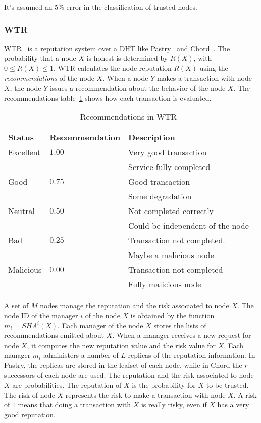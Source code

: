 It's assumed an $5\%$ error in the classification of trusted nodes.

\subsubsection{WTR}
\label{sec:wtr}
WTR~\cite{bonnaire2009wtr} is a reputation system over a DHT like Pastry~\cite{pastry} and
Chord~\cite{chord}. The probability that a node $X$ is honest is determined by
$R(X)$, with $0 \leq R(X) \leq 1$. WTR calculates the node reputation $R(X)$
using the \textit{recommendations} of the node $X$. When a node $Y$ makes a transaction with
node $X$, the node $Y$ issues a recommendation about the behavior of the node
$X$. The recommendations table~\ref{table:wtr_recomendations} shows how each
transaction is evaluated.
 
  \begin{table}
    \centering
    \footnotesize
    \begin{tabular}{|l|l|l|}
      \hline
      \textbf{Status} & \textbf{Recommendation} & \textbf{Description}\\
      \hline
      Excellent  & $1.00$    & Very good transaction\\
                &           & Service fully completed\\
      Good      & $0.75$    & Good transaction\\
                &           & Some degradation\\
      Neutral   & $0.50$     & Not completed correctly\\
                &           & Could be independent of the node\\
      Bad       & $0.25$    & Transaction not completed.\\
                &           & Maybe a malicious node\\
      Malicious & $0.00$    & Transaction not completed\\
                &           & Fully malicious node\\
      \hline
    \end{tabular}
    \caption{Recommendations in WTR}
    \label{table:wtr_recomendations}
  \end{table}

A set of $M$ nodes manage the reputation and the risk associated to node $X$.
The node ID of the manager $i$ of the node $X$ is
obtained by the function $m_i = SHA^{i}(X)$. Each manager of the node $X$
stores the lists of recommendations emitted about $X$. When a manager receives a
new request for node $X$, it computes the new reputation value and the risk
value for $X$.
Each manager $m_i$ administers a number of $L$ replicas of the reputation information. In Pastry,
the replicas are stored in the leafset of each node, while in Chord the $r$
successors of each node are used.
The reputation and the risk associated to node $X$ are probabilities. The
reputation of $X$ is the probability for $X$ to be trusted. The risk of node
$X$ represents the risk to make a transaction with node $X$. A risk of $1$
means that doing a transaction with $X$ is really risky, even if $X$ has a very
good reputation.

